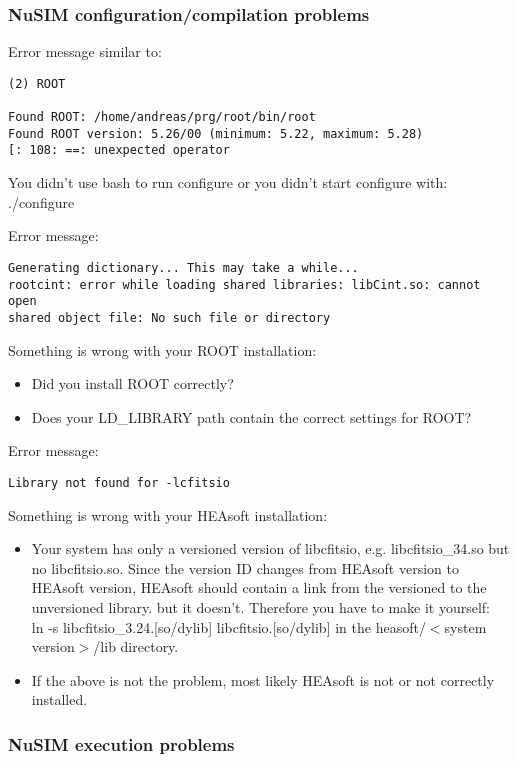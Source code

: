 \subsubsection{NuSIM configuration/compilation problems}

Error message similar to:
\begin{verbatim}
(2) ROOT

Found ROOT: /home/andreas/prg/root/bin/root
Found ROOT version: 5.26/00 (minimum: 5.22, maximum: 5.28)
[: 108: ==: unexpected operator
\end{verbatim}
You didn't use bash to run configure or you didn't start configure with: ./configure


Error message:
\begin{verbatim}
Generating dictionary... This may take a while...
rootcint: error while loading shared libraries: libCint.so: cannot open
shared object file: No such file or directory
\end{verbatim}

Something is wrong with your ROOT installation:
\begin{itemize}
\item Did you install ROOT correctly?
\item	Does your LD\_LIBRARY path contain the correct settings for ROOT?
\end{itemize}
Error message:
\begin{verbatim}
Library not found for -lcfitsio
\end{verbatim}
Something is wrong with your HEAsoft installation:
\begin{itemize}
\item	Your system has only a versioned version of libcfitsio, e.g. libcfitsio\_34.so but no libcfitsio.so. Since the version ID changes from HEAsoft version to HEAsoft version, HEAsoft should contain a link from the versioned to the unversioned library. but it doesn't. Therefore you have to make it yourself:\\
ln -s libcfitsio\_3.24.[so/dylib] libcfitsio.[so/dylib]
in the heasoft/$<$system version$>$/lib directory.
\item	If the above is not the problem, most likely HEAsoft is not or not correctly installed.
\end{itemize}

\subsubsection{NuSIM execution problems}

